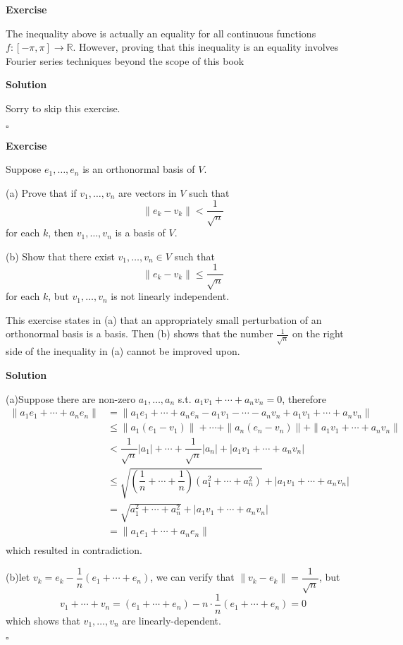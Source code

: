 \documentclass{article}
\newenvironment{exercise}{%
{\textbf{Exercise\\}
    }
}{
}
\newenvironment{solution}{%
{
    \textbf{Solution\\}
    }
}{
  \hfill $\square$ 
  \par\bigskip 
}
\newcommand{\RR}{\mathbb{R}}
\newcommand{\parameter}[1]{\left(#1\right)}
\begin{document}
\begin{CJK}{UTF8}{gkai}
\begin{exercise}
    The inequality above is actually an equality for all continuous functions $f : [-\pi,\pi] \to \RR$. However, proving that this inequality is an equality involves Fourier series techniques beyond the scope of this book
\end{exercise}

\begin{solution}
    Sorry to skip this exercise.
\end{solution}

\begin{exercise}
    Suppose $e_1,\ldots,e_n$ is an orthonormal basis of $V$.

    (a) Prove that if $v_1,\ldots,v_n$ are vectors in $V$ such that
    \[\|e_k - v_k\| < \dfrac{1}{\sqrt{n}}\]
    for each $k$, then $v_1,\ldots,v_n$ is a basis of $V$.

    (b) Show that there exist $v_1,\ldots,v_n \in V$ such that
    \[\|e_k - v_k\| \leq  \dfrac{1}{\sqrt{n}}\]
    for each $k$, but $v_1,\ldots,v_n$ is not linearly independent.

    This exercise states in (a) that an appropriately small perturbation of an orthonormal basis is a basis. Then (b) shows that the number $\frac{1}{\sqrt{n}}$ on the right side of the inequality in (a) cannot be improved upon.
\end{exercise}

\begin{solution}
    (a)Suppose there are non-zero $a_1,\ldots,a_n$ s.t. $a_1 v_1 + \cdots + a_n v_n = 0$, therefore
    \begin{align*}
    \|a_1e_1 + \cdots + a_ne_n\| &= \|a_1e_1 + \cdots + a_ne_n - a_1v_1 - \cdots - a_nv_n + a_1v_1 + \cdots + a_nv_n\| \\
    &\leq \|a_1(e_1 - v_1)\| + \cdots + \|a_n(e_n - v_n)\| + \|a_1v_1 + \cdots + a_nv_n\| \\
    &< \dfrac{1}{\sqrt{n}}|a_1| + \cdots + \dfrac{1}{\sqrt{n}}|a_n| + |a_1v_1 + \cdots + a_nv_n| \\
    &\leq \sqrt{\parameter{\dfrac{1}{n} + \cdots + \dfrac{1}{n}}(a_1^2 + \cdots + a_n^2)}+ |a_1v_1 + \cdots + a_nv_n| \\
    &= \sqrt{a_1^2 + \cdots + a_n^2} + |a_1v_1 + \cdots + a_nv_n|\\
    &= \|a_1e_1 + \cdots + a_ne_n\|\\
    \end{align*}
    which resulted in contradiction.

    (b)let $v_k = e_k - \dfrac{1}{n}(e_1 + \cdots + e_n)$, we can verify that $\|v_k - e_k\| = \dfrac{1}{\sqrt{n}}$, but
    \[v_1 + \cdots + v_n = (e_1 + \cdots + e_n) - n \cdot \dfrac{1}{n}  (e_1 + \cdots + e_n) = 0\]
    which shows that $v_1,\ldots,v_n$ are linearly-dependent.
\end{solution}



\end{CJK}
\end{document}
